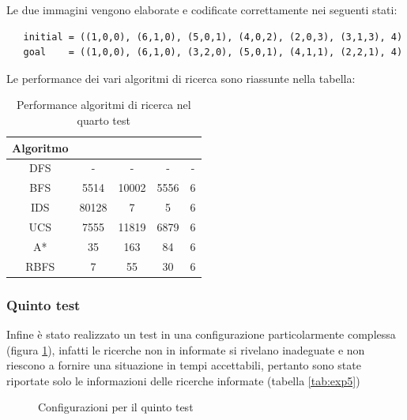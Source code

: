 \documentclass{article}
\begin{document}
	Le due immagini vengono elaborate e codificate correttamente nei seguenti stati:
	\begin{verbatim}
   initial = ((1,0,0), (6,1,0), (5,0,1), (4,0,2), (2,0,3), (3,1,3), 4)
   goal    = ((1,0,0), (6,1,0), (3,2,0), (5,0,1), (4,1,1), (2,2,1), 4)
	\end{verbatim}
	Le performance dei vari algoritmi di ricerca sono riassunte nella tabella:
	\begin{table}[H]
		\centering
		\def\arraystretch{1.5}
		\begin{tabular}{|c|c|c|c|c|}
			\hline
			\textbf{Algoritmo} & \bm{$n$} & \bm{$m$} & \bm{$\mu$} & \bm{$l$} \\
			\hline
			DFS & - & - & - & - \\
			\hline
			BFS & 5514 & 10002 & 5556 & 6 \\
			\hline
			IDS &  80128 & 7 & 5 & 6 \\
			\hline
			UCS &  7555 & 11819 & 6879 & 6 \\
			\hline
			A* &  35 & 163 & 84 & 6 \\
			\hline
			RBFS & 7 & 55 & 30 & 6 \\
			\hline
			
		\end{tabular}
		\caption{Performance algoritmi di ricerca nel quarto test}
		\label{tab:exp4}
	\end{table}


	\subsubsection{Quinto test}
	Infine è stato realizzato un test in una configurazione particolarmente complessa (figura \ref{fig:exp5}), infatti le ricerche non in informate si rivelano inadeguate e non riescono a fornire una situazione in tempi accettabili, pertanto sono state riportate solo le informazioni delle ricerche informate (tabella \ref{tab:exp5}) 
	\begin{figure}[H]
		\centering
		\protect\caption{Configurazioni per il quinto test}
		\label{fig:exp5}
	\end{figure}
	
\end{document}
